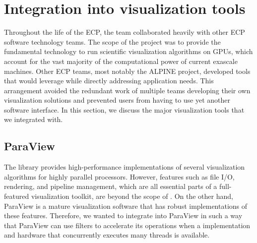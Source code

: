 \section{Integration into visualization tools}

Throughout the life of the ECP, the \vtkm team collaborated heavily with other ECP software technology teams.
The scope of the \vtkm project was to provide the fundamental technology to run scientific visualization algorithms on GPUs, which account for the vast majority of the computational power of current exascale machines.
Other ECP teams, most notably the ALPINE project, developed tools that would leverage \vtkm while directly addressing application needs.
This arrangement avoided the redundant work of multiple teams developing their own visualization solutions and prevented users from having to use yet another software interface.
In this section, we discuss the major visualization tools that we integrated \vtkm with.


\subsection{ParaView}

The \vtkm library provides high-performance implementations of several visualization algorithms for highly parallel processors.
However, features such as file I/O, rendering, and pipeline management, which are all essential parts of a full-featured visualization toolkit, are beyond the scope of \vtkm.
On the other hand, ParaView is a mature visualization software that has robust implementations of these features.
Therefore, we wanted to integrate \vtkm into ParaView in such a way that ParaView can use \vtkm filters to accelerate its operations when a \vtkm implementation and hardware that concurrently executes many threads is available.

